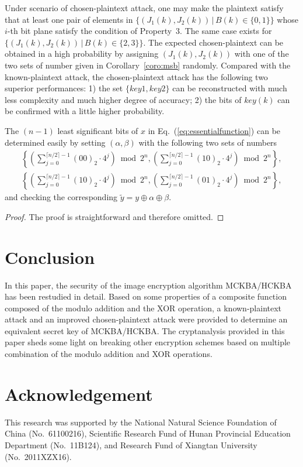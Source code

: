 \documentclass{ws-ijbc}
\begin{document}
Under scenario of chosen-plaintext attack, one may make the plaintext satisfy that at least one pair of elements in $\{(J_1(k), J_2(k))\,|\,B(k)\in\{0, 1\}\}$ whose $i$-th bit plane satisfy the condition of Property~3. The same case exists for $\{(J_1(k), J_2(k))\,|\,B(k)\in\{2, 3\}\}$. The expected chosen-plaintext can be
obtained in a high probability by assigning $(J_1(k), J_2(k))$ with one of the two sets of number given in Corollary~\ref{coro:msb} randomly. Compared with
the known-plaintext attack, the chosen-plaintext attack has the following two superior performances:
1) the set $\{key1, key2\}$ can be reconstructed with much less complexity and much higher degree of accuracy;
2) the bits of $key(k)$ can be confirmed with a little higher probability.

\begin{corollary}
The $(n-1)$ least significant bits of $x$ in Eq.~(\ref{eq:essentialfunction}) can be determined easily
by setting $(\alpha, \beta)$ with the following two sets of numbers
\label{coro:msb}
\begin{eqnarray*}
\left\{ \left(\sum\nolimits_{j=0}^{\lceil n/2\rceil-1}(00)_2\cdot 4^j\right)\bmod 2^n, \left(\sum\nolimits_{j=0}^{\lceil n/2\rceil-1}(10)_2\cdot 4^j\right)\bmod 2^n\right\},\\
\left\{ \left(\sum\nolimits_{j=0}^{\lceil n/2\rceil-1}(10)_2\cdot 4^j\right)\bmod 2^n, \left(\sum\nolimits_{j=0}^{\lceil n/2\rceil-1}(01)_2\cdot 4^j\right)\bmod 2^n\right\},
\end{eqnarray*}
and checking the corresponding $\tilde{y}=y\oplus \alpha\oplus \beta$.
\end{corollary}
\begin{proof}
The proof is straightforward and therefore omitted.
\end{proof}

\section{Conclusion}

In this paper, the security of the image encryption algorithm MCKBA/HCKBA has been restudied
in detail. Based on some properties of a composite function composed of the modulo addition
and the XOR operation, a known-plaintext attack and an improved chosen-plaintext attack were provided
to determine an equivalent secret key of MCKBA/HCKBA. The cryptanalysis provided in
this paper sheds some light on breaking other encryption schemes based on multiple combination
of the modulo addition and XOR operations.

\section*{Acknowledgement}

This research was supported by the National Natural Science Foundation of China (No.~61100216), Scientific Research Fund of Hunan Provincial Education Department (No.~11B124), and Research Fund of Xiangtan University (No.~2011XZX16).



\end{document}
